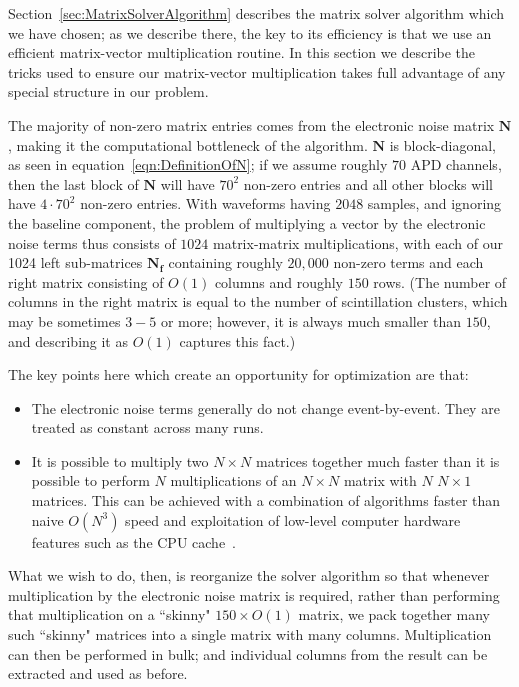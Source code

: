 Section~\ref{sec:MatrixSolverAlgorithm} describes the matrix solver algorithm which we have chosen; as we describe there, the key to its efficiency is that we use an efficient matrix-vector multiplication routine.  In this section we describe the tricks used to ensure our matrix-vector multiplication takes full advantage of any special structure in our problem.

The majority of non-zero matrix entries comes from the electronic noise matrix $\mathbf{N}$, making it the computational bottleneck of the algorithm.  $\mathbf{N}$ is block-diagonal, as seen in equation~\ref{eqn:DefinitionOfN}; if we assume roughly $70$ APD channels, then the last block of $\mathbf{N}$ will have $70^2$ non-zero entries and all other blocks will have $4\cdot 70^2$ non-zero entries.  With waveforms having $2048$ samples, and ignoring the baseline component, the problem of multiplying a vector by the electronic noise terms thus consists of $1024$ matrix-matrix multiplications, with each of our 1024 left sub-matrices $\mathbf{N_f}$ containing roughly $20,000$ non-zero terms and each right matrix consisting of $O(1)$ columns and roughly $150$ rows.  (The number of columns in the right matrix is equal to the number of scintillation clusters, which may be sometimes $3-5$ or more; however, it is always much smaller than $150$, and describing it as $O(1)$ captures this fact.)

The key points here which create an opportunity for optimization are that:
\begin{itemize}
\item The electronic noise terms generally do not change event-by-event.  They are treated as constant across many runs.
\item It is possible to multiply two $N \times N$ matrices together much faster than it is possible to perform $N$ multiplications of an $N \times N$ matrix with $N$ $N \times 1$ matrices.  This can be achieved with a combination of algorithms faster than naive $O(N^3)$ speed and exploitation of low-level computer hardware features such as the CPU cache~\cite{BLASFirstReference,AnatomyOfMatrixMultiply}.
\end{itemize}
What we wish to do, then, is reorganize the solver algorithm so that whenever multiplication by the electronic noise matrix is required, rather than performing that multiplication on a ``skinny" $150 \times O(1)$ matrix, we pack together many such ``skinny" matrices into a single matrix with many columns.  Multiplication can then be performed in bulk; and individual columns from the result can be extracted and used as before.

